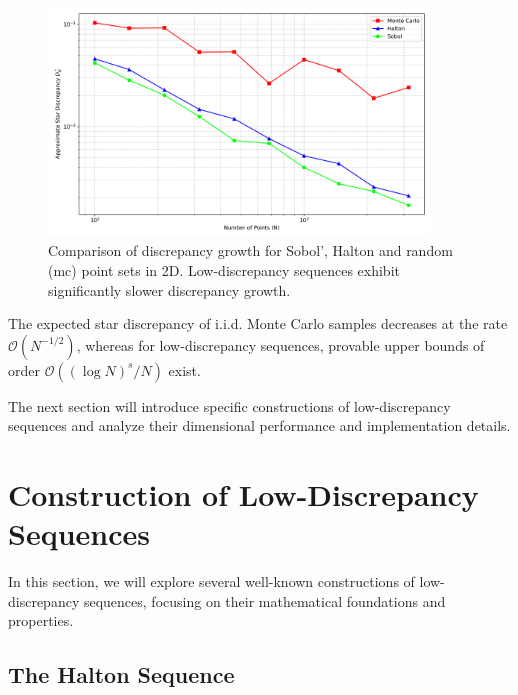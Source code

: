 \begin{figure}[H]
\centering
\includegraphics[width=0.9\textwidth]{Figures/qmc_discrepancy_comparison.png}
\caption{Comparison of discrepancy growth for Sobol', Halton and random
(\ac{mc}) point sets in 2D. Low-discrepancy sequences exhibit significantly
slower discrepancy growth.}
\label{fig:qmc-discrepancy-comparison}
\end{figure}

\begin{remark}
The expected star discrepancy of i.i.d. Monte Carlo samples decreases at the
rate $\mathcal{O}(N^{-1/2})$, whereas for low-discrepancy sequences, provable
upper bounds of order $\mathcal{O}((\log N)^s / N)$ exist.
\cite[Section~2.2]{leobacher2014introduction}
\end{remark}

The next section will introduce specific constructions of low-discrepancy
sequences and analyze their dimensional performance and implementation details.


\section{Construction of Low-Discrepancy Sequences}

In this section, we will explore several well-known constructions of
low-discrepancy sequences, focusing on their mathematical foundations and
properties.

\subsection{The Halton Sequence}
\label{subsec:halton-sequence}

